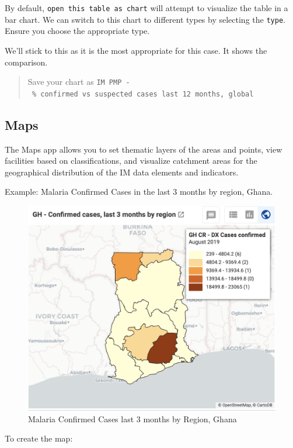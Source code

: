 \documentclass[]{book}
\begin{document}
By default, \texttt{open\ this\ table\ as\ chart} will attempt to visualize the table in a bar chart. We can switch to this chart to different types by selecting the \texttt{type}. Ensure you choose the appropriate type.

We'll stick to this as it is the most appropriate for this case. It shows the comparison.

\begin{quote}
Save your chart as \texttt{IM\ PMP\ -\ \%\ confirmed\ vs\ suspected\ cases\ last\ 12\ months,\ global}
\end{quote}

\hypertarget{map}{%
\subsection{Maps}\label{map}}

The Maps app allows you to set thematic layers of the areas and points, view facilities based on classifications, and visualize catchment areas for the geographical distribution of the IM data elements and indicators.

Example: Malaria Confirmed Cases in the last 3 months by region, Ghana.

\begin{figure}
\includegraphics[width=15.06in]{./images/maps2} \caption{Malaria Confirmed Cases last 3 months by Region, Ghana}\label{fig:maps2}
\end{figure}

To create the map:
\end{document}

